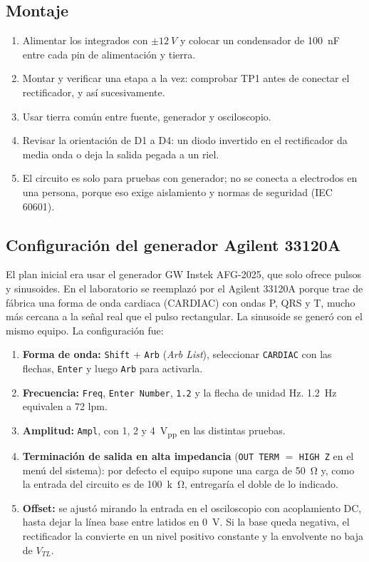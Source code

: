 \documentclass[11pt,letterpaper]{article}
\newcommand{\VTL}{V_{TL}}
\begin{document}
\subsection{Montaje}
\begin{enumerate}
  \item Alimentar los integrados con $\pm\SI{12}{V}$ y colocar un condensador de \SI{100}{nF} entre cada pin de alimentación y tierra.
  \item Montar y verificar una etapa a la vez: comprobar TP1 antes de conectar el rectificador, y así sucesivamente.
  \item Usar tierra común entre fuente, generador y osciloscopio.
  \item Revisar la orientación de D1 a D4: un diodo invertido en el rectificador da media onda o deja la salida pegada a un riel.
  \item El circuito es solo para pruebas con generador; no se conecta a electrodos en una persona, porque eso exige aislamiento y normas de seguridad (IEC 60601).
\end{enumerate}

\subsection{Configuración del generador Agilent 33120A}
El plan inicial era usar el generador GW Instek AFG-2025, que solo ofrece pulsos y sinusoides. En el laboratorio se reemplazó por el Agilent 33120A porque trae de fábrica una forma de onda cardiaca (CARDIAC) con ondas P, QRS y T, mucho más cercana a la señal real que el pulso rectangular. La sinusoide se generó con el mismo equipo. La configuración fue:
\begin{enumerate}
  \item \textbf{Forma de onda:} \texttt{Shift} + \texttt{Arb} (\textit{Arb List}), seleccionar \texttt{CARDIAC} con las flechas, \texttt{Enter} y luego \texttt{Arb} para activarla.
  \item \textbf{Frecuencia:} \texttt{Freq}, \texttt{Enter Number}, \texttt{1.2} y la flecha de unidad Hz. \SI{1,2}{Hz} equivalen a 72 lpm.
  \item \textbf{Amplitud:} \texttt{Ampl}, con 1, 2 y \SI{4}{V_{pp}} en las distintas pruebas.
  \item \textbf{Terminación de salida en alta impedancia} (\texttt{OUT TERM} $=$ \texttt{HIGH Z} en el menú del sistema): por defecto el equipo supone una carga de \SI{50}{\ohm} y, como la entrada del circuito es de \SI{100}{k\ohm}, entregaría el doble de lo indicado.
  \item \textbf{Offset:} se ajustó mirando la entrada en el osciloscopio con acoplamiento DC, hasta dejar la línea base entre latidos en \SI{0}{V}. Si la base queda negativa, el rectificador la convierte en un nivel positivo constante y la envolvente no baja de $\VTL$.
\end{enumerate}
\end{document}
